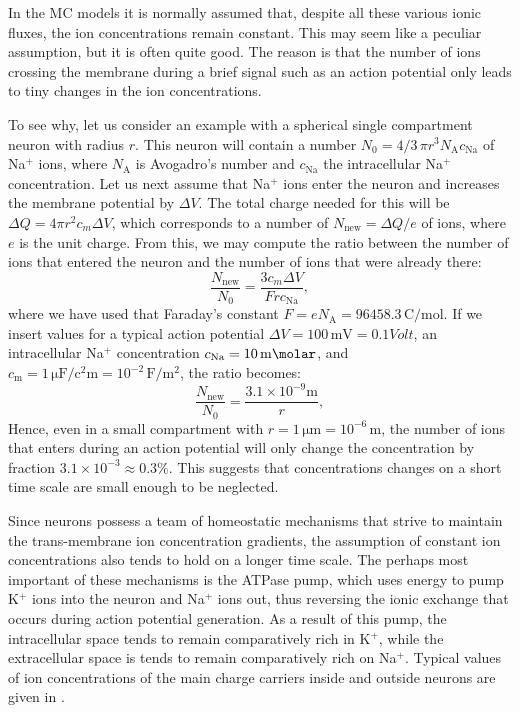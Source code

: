 In the MC models it is normally assumed that, despite all these various ionic fluxes, the ion concentrations remain constant. This may seem like a peculiar assumption, but it is often quite good. The reason is that the number of ions crossing the membrane during a brief signal such as an action potential only leads to tiny changes in the ion concentrations. 

To see why, let us consider an example with a spherical single compartment neuron with radius $r$. This neuron will contain a number $N_0 = 4/3 \,\pi r^3 N_\text{A} c_\text{Na}$ of Na$^{+}$ ions, where $N_\text{A}$ is Avogadro's number and $c_\text{Na}$ the intracellular Na$^{+}$ concentration. Let us next assume that Na$^+$ ions enter the neuron and increases the membrane potential by $\Delta V$. The total charge needed for this will be $\Delta Q = 4 \pi r^2 c_m \Delta V$, which corresponds to a number of $N_\text{new} = \Delta Q/e$ of ions, where $e$ is the unit charge. From this, we may compute the ratio between the number of ions that entered the neuron and the number of ions that were already there:
\begin{equation}
\frac{N_\text{new}}{N_0} = \frac{3 c_m \Delta V}{F r c_\text{Na}}, 
\label{eq:Neuron:NaNaNa}
\end{equation}
where we have used that Faraday's constant $F = eN_\text{A} = 96458.3 \, \si{\coulomb\per\mol}$. If we insert values for a typical action potential $\Delta V = 100 \,\si{\milli\volt} = 0.1 \si{Volt}$, an intracellular Na$^+$ concentration $c_\text{Na} = 10 \, \si{\milli\molar}$, and $c_\text{m} = 1 \, \si{\micro\farad\per\square\centi\metre} = 10^{-2}\, \si{\farad\per\square\metre}$, the ratio becomes:
\begin{equation}
\frac{N_\text{new}}{N_0} = \frac{3.1 \times 10^{-9} \si{\metre}}{r}, 
\label{eq:Neuron:NaNaNaNa}
\end{equation}
Hence, even in a small compartment with $r=1\,\si{\micro\metre} = 10^{-6}\,\si{\metre}$, the number of ions that enters during an action potential will only change the concentration by fraction $3.1 \times 10^{-3} \approx 0.3 \%$. This suggests that concentrations changes on a short time scale are small enough to be neglected. 

Since neurons possess a team of homeostatic mechanisms that strive to maintain the trans-membrane ion concentration gradients, the assumption of constant ion concentrations also tends to hold on a longer time scale. The perhaps most important of these mechanisms is the ATPase pump, which uses  energy  to pump  K$^+$ ions into the neuron and  Na$^+$ ions out, thus reversing the ionic exchange that occurs during action potential generation. As a result of this pump, the intracellular space tends to remain comparatively rich in K$^+$, while the extracellular space is tends to remain comparatively rich on Na$^+$. Typical values of ion concentrations of the main charge carriers inside and outside neurons are given in . 

